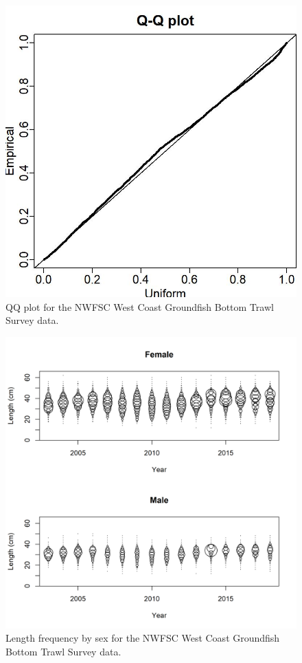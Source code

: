 \documentclass[12pt,]{article}
\begin{document}
\begin{figure}
\centering
\includegraphics{Figures/nwfsc_Posterior_Predictive-Histogram-1.jpg}
\caption{QQ plot for the NWFSC West Coast Groundfish Bottom Trawl Survey
data. \label{fig:nw_qq}}
\end{figure}

\FloatBarrier

\begin{figure}
\centering
\includegraphics{Figures/NWFSC Groundfish Bottom Trawl Survey_Length_Frequency.png}
\caption{Length frequency by sex for the NWFSC West Coast Groundfish
Bottom Trawl Survey data. \label{fig:nw_len_freq}}
\end{figure}
\end{document}
